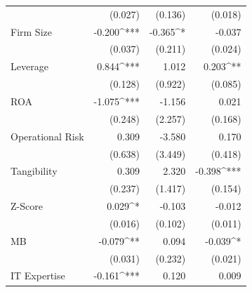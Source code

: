\documentclass[11pt]{article}
\begin{document}
\begin{table}[ht]
\begin{tabular}{@{\extracolsep{5pt}}lD{.}{.}{-3} D{.}{.}{-3} D{.}{.}{-3} }
                        & (0.027)                         & (0.136)                             & (0.018)                     \\
    Firm Size           & -0.200^{***}                    & -0.365^{*}                          & -0.037                      \\
                        & (0.037)                         & (0.211)                             & (0.024)                     \\
    Leverage            & 0.844^{***}                     & 1.012                               & 0.203^{**}                  \\
                        & (0.128)                         & (0.922)                             & (0.085)                     \\
    ROA                 & -1.075^{***}                    & -1.156                              & 0.021                       \\
                        & (0.248)                         & (2.257)                             & (0.168)                     \\
    Operational Risk    & 0.309                           & -3.580                              & 0.170                       \\
                        & (0.638)                         & (3.449)                             & (0.418)                     \\
    Tangibility         & 0.309                           & 2.320                               & -0.398^{***}                \\
                        & (0.237)                         & (1.417)                             & (0.154)                     \\
    Z-Score             & 0.029^{*}                       & -0.103                              & -0.012                      \\
                        & (0.016)                         & (0.102)                             & (0.011)                     \\
    MB                  & -0.079^{**}                     & 0.094                               & -0.039^{*}                  \\
                        & (0.031)                         & (0.232)                             & (0.021)                     \\
    IT Expertise        & -0.161^{***}                    & 0.120                               & 0.009                       \\

\end{tabular}
\end{table}
\end{document}
